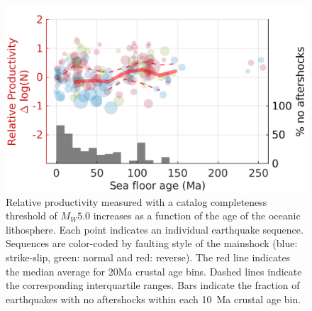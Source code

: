\documentclass[draft]{agujournal}
\begin{document}
\begin{figure}[H]
\centering
\includegraphics{figures/prod_vs_age_mw5.png}
\caption{Relative productivity measured with a catalog completeness threshold of $M_W5.0$ increases as a function of the age of the oceanic lithosphere. Each point indicates an individual earthquake sequence. Sequences are color-coded by faulting style of the mainshock (blue: strike-slip, green: normal and red: reverse). The red line indicates the median average for 20Ma crustal age bins. Dashed lines indicate the corresponding interquartile ranges. Bars indicate the fraction of earthquakes with no aftershocks within each 10~Ma crustal age bin.}
\label{fig:prod_vs_age}
\end{figure}   
\end{document}
